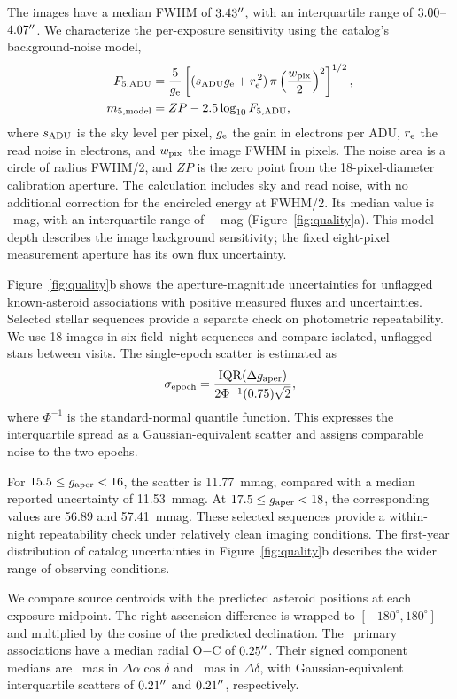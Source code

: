 The images have a median FWHM of $3.43^{\prime\prime}$, with an
interquartile range of $3.00$--$4.07^{\prime\prime}$.
We characterize the per-exposure sensitivity using the catalog's
background-noise model,
\begin{align}
F_{5,\rm ADU} &=\frac{5}{g_{\rm e}}
 \left[(s_{\rm ADU}g_{\rm e}+r_{\rm e}^{\,2})\,
 \pi\left(\frac{w_{\rm pix}}{2}\right)^2\right]^{1/2},\\
m_{5,\rm model} &= ZP-2.5\log_{10}F_{5,\rm ADU},
\label{eq:depth}
\end{align}
where $s_{\rm ADU}$ is the sky level per pixel, $g_{\rm e}$ the gain
in electrons per ADU, $r_{\rm e}$ the read noise in electrons,
and $w_{\rm pix}$ the image FWHM in pixels. The noise area is a
circle of radius FWHM/2, and $ZP$ is the zero point from the
18-pixel-diameter calibration aperture. The calculation includes
sky and read noise, with no additional correction for the
encircled energy at FWHM/2. Its median value is \yrDepth~mag,
with an interquartile range of \yrDepthLow--\yrDepthHigh~mag
(Figure~\ref{fig:quality}a). This model depth describes the image
background sensitivity; the fixed eight-pixel measurement aperture
has its own flux uncertainty.

Figure~\ref{fig:quality}b shows the aperture-magnitude uncertainties
for unflagged known-asteroid associations with positive measured
fluxes and uncertainties. Selected stellar sequences provide a
separate check on photometric repeatability. We use 18 images in
six field--night sequences and compare isolated, unflagged stars
between visits. The single-epoch scatter is estimated as
\begin{equation}
\sigma_{\rm epoch}=\frac{\mathrm{IQR}(\Delta g_{\rm aper})}
 {2\Phi^{-1}(0.75)\sqrt{2}},
\label{eq:repeatability}
\end{equation}
where $\Phi^{-1}$ is the standard-normal quantile function.
This expresses the interquartile spread as a Gaussian-equivalent
scatter and assigns comparable noise to the two epochs.

For $15.5\leq g_{\rm aper}<16$, the scatter is 11.77~mmag, compared
with a median reported uncertainty of 11.53~mmag. At
$17.5\leq g_{\rm aper}<18$, the corresponding values are
56.89 and 57.41~mmag. These selected sequences provide a
within-night repeatability check under relatively clean imaging
conditions. The first-year distribution of catalog uncertainties
in Figure~\ref{fig:quality}b describes the wider range of
observing conditions.

\label{sec:astrometry}
We compare source centroids with the predicted asteroid positions
at each exposure midpoint. The right-ascension difference is
wrapped to $[-180^\circ,180^\circ]$ and multiplied by the cosine
of the predicted declination. The \yrNAssoc\ primary associations
have a median radial O$-$C of $0.25^{\prime\prime}$. Their signed component
medians are \yrRAOffset~mas in $\Delta\alpha\cos\delta$ and
\yrDecOffset~mas in $\Delta\delta$, with Gaussian-equivalent
interquartile scatters of $0.21^{\prime\prime}$ and
$0.21^{\prime\prime}$, respectively.

